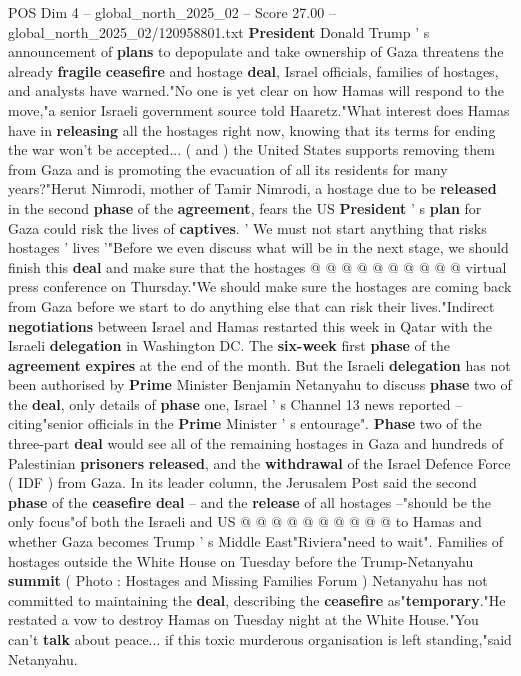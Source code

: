 \begin{textsample}{POS Dim 4 – global\_north\_2025\_02 – Score 27.00 – global\_north\_2025\_02/120958801.txt}  \label{ex:f4_pos_060}
\textbf{President} Donald Trump ' s announcement of \textbf{plans} to depopulate and take ownership of Gaza threatens the already \textbf{fragile} \textbf{ceasefire} and hostage \textbf{deal}, Israel officials, families of hostages, and analysts have warned."No one is yet clear on how Hamas will respond to the move,"a senior Israeli government source told Haaretz."What interest does Hamas have in \textbf{releasing} all the hostages right now, knowing that its terms for ending the war won't be accepted... ( and ) the United States supports removing them from Gaza and is promoting the evacuation of all its residents for many years?"Herut Nimrodi, mother of Tamir Nimrodi, a hostage due to be \textbf{released} in the second \textbf{phase} of the \textbf{agreement}, fears the US \textbf{President} ' s \textbf{plan} for Gaza could risk the lives of \textbf{captives}. ' We must not start anything that risks hostages ' lives '"Before we even discuss what will be in the next stage, we should finish this \textbf{deal} and make sure that the hostages @ @ @ @ @ @ @ @ @ @ virtual press conference on Thursday."We should make sure the hostages are coming back from Gaza before we start to do anything else that can risk their lives."Indirect \textbf{negotiations} between Israel and Hamas restarted this week in Qatar with the Israeli \textbf{delegation} in Washington DC.
The \textbf{six-week} first \textbf{phase} of the \textbf{agreement} \textbf{expires} at the end of the month.
But the Israeli \textbf{delegation} has not been authorised by \textbf{Prime} Minister Benjamin Netanyahu to discuss \textbf{phase} two of the \textbf{deal}, only details of \textbf{phase} one, Israel ' s Channel 13 news reported -- citing"senior officials in the \textbf{Prime} Minister ' s entourage". \textbf{Phase} two of the three-part \textbf{deal} would see all of the remaining hostages in Gaza and hundreds of Palestinian \textbf{prisoners} \textbf{released}, and the \textbf{withdrawal} of the Israel Defence Force ( IDF ) from Gaza.
In its leader column, the Jerusalem Post said the second \textbf{phase} of the \textbf{ceasefire} \textbf{deal} -- and the \textbf{release} of all hostages --"should be the only focus"of both the Israeli and US @ @ @ @ @ @ @ @ @ @ to Hamas and whether Gaza becomes Trump ' s Middle East"Riviera"need to wait".
Families of hostages outside the White House on Tuesday before the Trump-Netanyahu \textbf{summit} ( Photo : Hostages and Missing Families Forum ) Netanyahu has not committed to maintaining the \textbf{deal}, describing the \textbf{ceasefire} as"\textbf{temporary}."He restated a vow to destroy Hamas on Tuesday night at the White House."You can't \textbf{talk} about peace... if this toxic murderous organisation is left standing,"said Netanyahu.

\end{textsample}
